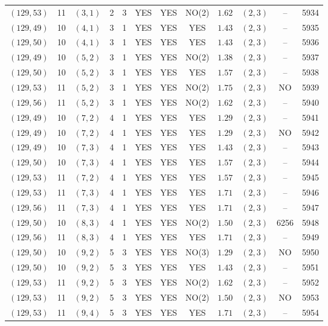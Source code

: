 \begin{longtable}{|c|c|c|c|c|c|c|c|c|c|c|c|}
$(129,53)$ & 11 & $(3,1)$ & 2 & 3 & YES & YES & NO(2) & $1.62$ & $(2,3)$ & -- & 5934\\
$(129,49)$ & 10 & $(4,1)$ & 3 & 1 & YES & YES & YES & $1.43$ & $(2,3)$ & -- & 5935\\
$(129,50)$ & 10 & $(4,1)$ & 3 & 1 & YES & YES & YES & $1.43$ & $(2,3)$ & -- & 5936\\
$(129,49)$ & 10 & $(5,2)$ & 3 & 1 & YES & YES & NO(2) & $1.38$ & $(2,3)$ & -- & 5937\\
$(129,50)$ & 10 & $(5,2)$ & 3 & 1 & YES & YES & YES & $1.57$ & $(2,3)$ & -- & 5938\\
$(129,53)$ & 11 & $(5,2)$ & 3 & 1 & YES & YES & NO(2) & $1.75$ & $(2,3)$ & NO & 5939\\
$(129,56)$ & 11 & $(5,2)$ & 3 & 1 & YES & YES & NO(2) & $1.62$ & $(2,3)$ & -- & 5940\\
$(129,49)$ & 10 & $(7,2)$ & 4 & 1 & YES & YES & YES & $1.29$ & $(2,3)$ & -- & 5941\\
$(129,49)$ & 10 & $(7,2)$ & 4 & 1 & YES & YES & YES & $1.29$ & $(2,3)$ & NO & 5942\\
$(129,49)$ & 10 & $(7,3)$ & 4 & 1 & YES & YES & YES & $1.43$ & $(2,3)$ & -- & 5943\\
$(129,50)$ & 10 & $(7,3)$ & 4 & 1 & YES & YES & YES & $1.57$ & $(2,3)$ & -- & 5944\\
$(129,53)$ & 11 & $(7,2)$ & 4 & 1 & YES & YES & YES & $1.57$ & $(2,3)$ & -- & 5945\\
$(129,53)$ & 11 & $(7,3)$ & 4 & 1 & YES & YES & YES & $1.71$ & $(2,3)$ & -- & 5946\\
$(129,56)$ & 11 & $(7,3)$ & 4 & 1 & YES & YES & YES & $1.71$ & $(2,3)$ & -- & 5947\\
$(129,50)$ & 10 & $(8,3)$ & 4 & 1 & YES & YES & NO(2) & $1.50$ & $(2,3)$ & 6256 & 5948\\
$(129,56)$ & 11 & $(8,3)$ & 4 & 1 & YES & YES & YES & $1.71$ & $(2,3)$ & -- & 5949\\
$(129,50)$ & 10 & $(9,2)$ & 5 & 3 & YES & YES & NO(3) & $1.29$ & $(2,3)$ & NO & 5950\\
$(129,50)$ & 10 & $(9,2)$ & 5 & 3 & YES & YES & YES & $1.43$ & $(2,3)$ & -- & 5951\\
$(129,53)$ & 11 & $(9,2)$ & 5 & 3 & YES & YES & NO(2) & $1.62$ & $(2,3)$ & -- & 5952\\
$(129,53)$ & 11 & $(9,2)$ & 5 & 3 & YES & YES & NO(2) & $1.50$ & $(2,3)$ & NO & 5953\\
$(129,53)$ & 11 & $(9,4)$ & 5 & 3 & YES & YES & YES & $1.71$ & $(2,3)$ & -- & 5954\\

\end{longtable}
